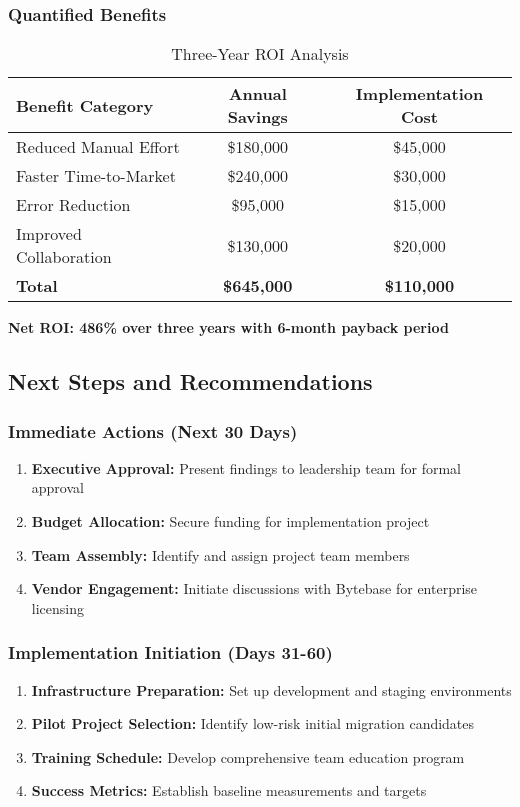 \subsubsection{Quantified Benefits}
\begin{table}[H]
\centering
\begin{tabular}{|l|c|c|}
\hline
\textbf{Benefit Category} & \textbf{Annual Savings} & \textbf{Implementation Cost} \\
\hline
Reduced Manual Effort & \$180,000 & \$45,000 \\
\hline
Faster Time-to-Market & \$240,000 & \$30,000 \\
\hline
Error Reduction & \$95,000 & \$15,000 \\
\hline
Improved Collaboration & \$130,000 & \$20,000 \\
\hline
\textbf{Total} & \textbf{\$645,000} & \textbf{\$110,000} \\
\hline
\end{tabular}
\caption{Three-Year ROI Analysis}
\label{tab:roi}
\end{table}

\textbf{Net ROI: 486\% over three years with 6-month payback period}

\subsection{Next Steps and Recommendations}

\subsubsection{Immediate Actions (Next 30 Days)}
\begin{enumerate}
    \item \textbf{Executive Approval:} Present findings to leadership team for formal approval
    \item \textbf{Budget Allocation:} Secure funding for implementation project
    \item \textbf{Team Assembly:} Identify and assign project team members
    \item \textbf{Vendor Engagement:} Initiate discussions with Bytebase for enterprise licensing
\end{enumerate}

\subsubsection{Implementation Initiation (Days 31-60)}
\begin{enumerate}
    \item \textbf{Infrastructure Preparation:} Set up development and staging environments
    \item \textbf{Pilot Project Selection:} Identify low-risk initial migration candidates
    \item \textbf{Training Schedule:} Develop comprehensive team education program
    \item \textbf{Success Metrics:} Establish baseline measurements and targets
\end{enumerate}

